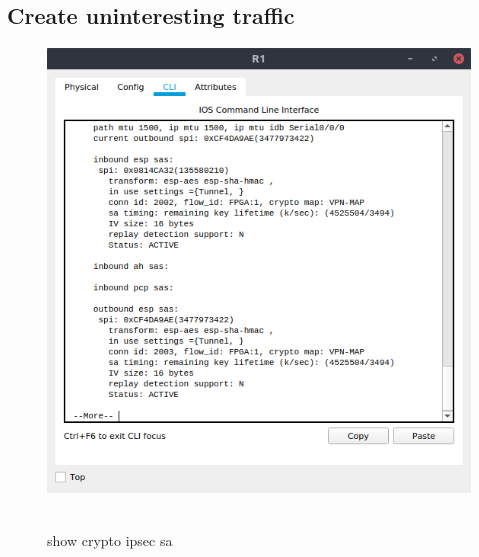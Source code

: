 \documentclass[12pt]{extarticle}
\begin{document}
\subsection{Create uninteresting traffic}
\begin{center}
\begin{figure}[H]
\includegraphics[scale=0.7]{resources/q33.png}\
\caption{show crypto ipsec sa}
\end{figure}
\end{center}
\end{document}
